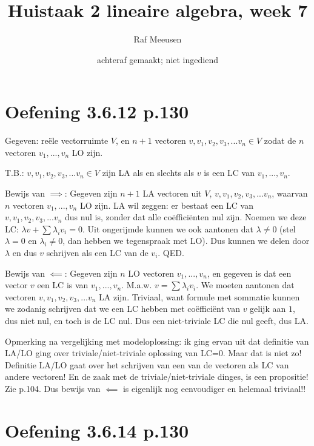 \documentclass{article}
\title{Huistaak 2 lineaire algebra, week 7}
\author{Raf Meeusen}
\date{achteraf gemaakt; niet ingediend}
\begin{document}
\maketitle

\section{Oefening 3.6.12 p.130}

Gegeven: re\"ele vectorruimte $V$, 
en $n+1$ vectoren $v, v_1, v_2, v_3, ... v_n \in V$ zodat de $n$ vectoren $v_1,...,v_n$ LO zijn. 

T.B.: $v, v_1, v_2, v_3, ... v_n \in V$ zijn LA als en slechts als $v$ is een LC van
$v_1,...,v_n$. 

Bewijs van $\implies$: Gegeven zijn $n+1$ LA vectoren uit $V$, $v, v_1, v_2, v_3, ... v_n$, waarvan $n$ vectoren $v_1,...,v_n$ LO zijn. 
LA wil zeggen: er bestaat een LC van $v, v_1, v_2, v_3, ... v_n$ dus nul is, zonder dat alle co\"effici\"enten nul zijn. Noemen we deze LC: $\lambda v + \sum \lambda_i  v_i = 0$. Uit ongerijmde kunnen we ook aantonen dat $\lambda \neq 0$ (stel  $\lambda = 0$ en $\lambda_i \neq 0$, dan hebben we tegenspraak met LO). Dus kunnen we delen door $\lambda$ en dus $v$ schrijven als een LC van de $v_i$. QED. 

 
Bewijs van $\impliedby$: Gegeven zijn  $n$ LO vectoren $v_1,...,v_n$, en gegeven is dat een vector $v$ een LC is van $v_1,...,v_n$. M.a.w. $v=\sum \lambda_i v_i$. We moeten aantonen dat vectoren  $v, v_1, v_2, v_3, ... v_n$ LA zijn. Triviaal, want formule met sommatie kunnen we zodanig schrijven dat we een LC hebben met co\"effici\"ent van $v$ gelijk aan $1$, dus niet nul, en toch is de LC nul. Dus een niet-triviale LC die nul geeft, dus LA. 

Opmerking na vergelijking met modeloplossing: ik ging ervan uit dat definitie van LA/LO ging over triviale/niet-triviale oplossing van LC=0. Maar dat is niet zo! Definitie LA/LO gaat over het schrijven van een van de vectoren als LC van andere vectoren! En de zaak met de triviale/niet-triviale dinges, is een propositie! Zie p.104. Dus bewijs van $\impliedby$ is eigenlijk nog eenvoudiger en helemaal triviaal!! 

\section{Oefening 3.6.14 p.130}
\end{document}
